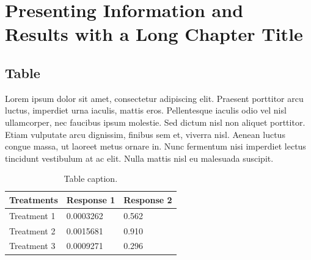 \documentclass[
	11pt, %
	fleqn, %
	a4paper, %
]{LegrandOrangeBook}
\begin{document}

\chapterspaceabove{6.25cm} %
\chapterspacebelow{7.5cm} %


\chapter{Presenting Information and Results with a Long Chapter Title}

\section{Table}

Lorem ipsum dolor sit amet, consectetur adipiscing elit. Praesent porttitor arcu luctus, imperdiet urna iaculis, mattis eros. Pellentesque iaculis odio vel nisl ullamcorper, nec faucibus ipsum molestie. Sed dictum nisl non aliquet porttitor. Etiam vulputate arcu dignissim, finibus sem et, viverra nisl. Aenean luctus congue massa, ut laoreet metus ornare in. Nunc fermentum nisi imperdiet lectus tincidunt vestibulum at ac elit. Nulla mattis nisl eu malesuada suscipit.

\begin{table}[H] %
	\centering %
	\begin{tabular}{L{0.15\textwidth} R{0.15\textwidth} R{0.15\textwidth}} %
		\toprule
		\textbf{Treatments} & \textbf{Response 1} & \textbf{Response 2} \\
		\midrule
		Treatment 1         & 0.0003262           & 0.562               \\
		Treatment 2         & 0.0015681           & 0.910               \\
		Treatment 3         & 0.0009271           & 0.296               \\
		\bottomrule
	\end{tabular}
	\caption{Table caption.}
	\label{tab:example} %
\end{table}
\end{document}
